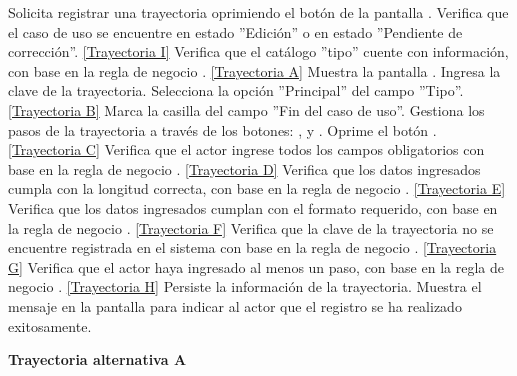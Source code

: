 	\begin{UCtrayectoria}
		\UCpaso[\UCactor] Solicita registrar una trayectoria oprimiendo el botón  de la pantalla .
		\UCpaso[\UCsist] Verifica que el caso de uso se encuentre en estado ''Edición'' o en estado ''Pendiente de corrección''. \hyperlink{CU12-1-1-1:TAI}{[Trayectoria I]}
		\UCpaso[\UCsist] Verifica que el catálogo ''tipo'' cuente con información, con base en la regla de negocio . \hyperlink{CU12-1-1-1:TAA}{[Trayectoria A]}
		\UCpaso[\UCsist] Muestra la pantalla . \label{CU12.1.1.1-P17}
		\UCpaso[\UCactor] Ingresa la clave de la trayectoria. \label{CU12.1.1.1-P16}
		\UCpaso[\UCactor] Selecciona la opción ''Principal'' del campo ''Tipo''. \hyperlink{CU12-1-1-1:TAB}{[Trayectoria B]} 
		\UCpaso[\UCsist] Marca la casilla del campo ''Fin del caso de uso''.
		\UCpaso[\UCactor] Gestiona los pasos de la trayectoria a través de los botones: , \editar y \eliminar. \label{CU12.1.1.1-P18}
		\UCpaso[\UCactor] Oprime el botón  . \hyperlink{CU12-1-1-1:TAC}{[Trayectoria C]} 
		\UCpaso[\UCsist] Verifica que el actor ingrese todos los campos obligatorios con base en la regla de negocio . \hyperlink{CU12-1-1-1:TAD}{[Trayectoria D]}
		\UCpaso[\UCsist] Verifica que los datos ingresados cumpla con la longitud correcta, con base en la regla de negocio . \hyperlink{CU12-1-1-1:TAE}{[Trayectoria E]}
		\UCpaso[\UCsist] Verifica que los datos ingresados cumplan con el formato requerido, con base en la regla de negocio . \hyperlink{CU12-1-1-1:TAF}{[Trayectoria F]}
		\UCpaso[\UCsist] Verifica que la clave de la trayectoria no se encuentre registrada en el sistema con base en la regla de negocio . \hyperlink{CU12-1-1-1:TAG}{[Trayectoria G]}
		\UCpaso[\UCsist] Verifica que el actor haya ingresado al menos un paso, con base en la regla de negocio . \hyperlink{CU12-1-1-1:TAH}{[Trayectoria H]}
		\UCpaso[\UCsist] Persiste la información de la trayectoria.
		\UCpaso[\UCsist] Muestra el mensaje  en la pantalla  para indicar al actor que el registro se ha realizado exitosamente.
	\end{UCtrayectoria}		
\hypertarget{CU12-1-1-1:TAA}{\textbf{Trayectoria alternativa A}}\\
